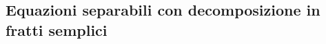 \subsection{Equazioni separabili con decomposizione in fratti semplici}
\label{sec:esercizi-equazioni-differenziali-separabili-con-fratti-semplici}
